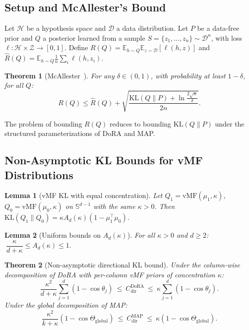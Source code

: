\documentclass[11pt]{article}
\newtheorem{theorem}{Theorem}
\newtheorem{lemma}{Lemma}
\newcommand{\KL}{\mathrm{KL}}
\newcommand{\vMF}{\mathrm{vMF}}
\newcommand{\Risk}{R}
\newcommand{\eRisk}{\hat{R}}
\newcommand{\Sd}{\mathbb{S}^{d-1}}
\newcommand{\Thetaglob}{\Theta_{\mathrm{global}}}
\newcommand{\E}{\mathbb{E}}
\begin{document}
\subsection{Setup and McAllester's Bound}
Let $\mathcal{H}$ be a hypothesis space and $\mathcal{D}$ a data distribution. Let
$P$ be a data-free prior and $Q$ a posterior learned from a sample
$S=\{z_1,\dots,z_n\}\sim\mathcal{D}^n$, with loss $\ell:\mathcal{H}\times\mathcal{Z}\to[0,1]$.
Define $\Risk(Q) = \E_{h\sim Q}\E_{z\sim\mathcal{D}}[\ell(h,z)]$ and
$\eRisk(Q) = \E_{h\sim Q}\frac1n\sum_i \ell(h,z_i)$.

\begin{theorem}[McAllester~\cite{mcallester}]\label{thm:mcallester}
For any $\delta\in(0,1)$, with probability at least $1-\delta$, for all $Q$:
\[
\Risk(Q) \le \eRisk(Q) + \sqrt{\frac{\KL(Q\|P) + \ln\frac{2\sqrt{n}}{\delta}}{2n}}.
\]
\end{theorem}

The problem of bounding $\Risk(Q)$ reduces to bounding $\KL(Q\|P)$ under the
structured parameterizations of DoRA and MAP.

\subsection{Non-Asymptotic KL Bounds for vMF Distributions}

\begin{lemma}[vMF KL with equal concentration]\label{lem:vmfkl}
Let $Q_1=\vMF(\mu_1,\kappa)$, $Q_0=\vMF(\mu_0,\kappa)$ on $\Sd$ with the same
$\kappa>0$. Then $\KL(Q_1\|Q_0) = \kappa A_d(\kappa)(1-\mu_1^\top\mu_0)$.
\end{lemma}

\begin{lemma}[Uniform bounds on $A_d(\kappa)$]\label{lem:adbounds}
For all $\kappa>0$ and $d\ge2$: $\ \dfrac{\kappa}{d+\kappa} \le A_d(\kappa) \le 1.$
\end{lemma}

\begin{theorem}[Non-asymptotic directional KL bound]\label{thm:nonasym}
Under the column-wise decomposition of DoRA with per-column vMF priors of
concentration $\kappa$:
\[
\frac{\kappa^2}{d+\kappa}\sum_{j=1}^d (1-\cos\theta_j)
\ \le\ C^{\mathrm{DoRA}}_{\mathrm{dir}} \ \le\ \kappa \sum_{j=1}^d (1-\cos\theta_j).
\]
Under the global decomposition of MAP:
\[
\frac{\kappa^2}{k+\kappa}(1-\cos\Thetaglob)
\ \le\ C^{\mathrm{MAP}}_{\mathrm{dir}} \ \le\ \kappa(1-\cos\Thetaglob).
\]
\end{theorem}
\end{document}

